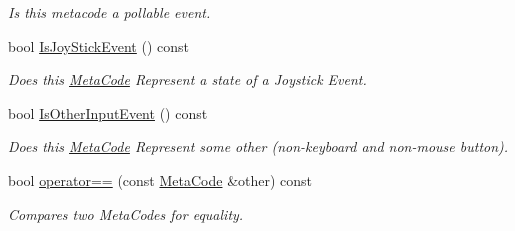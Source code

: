 \begin{DoxyCompactItemize}
\begin{DoxyCompactList}\small\item\em Is this metacode a pollable event. \item\end{DoxyCompactList}\item 
bool \hyperlink{classphys_1_1MetaCode_a00ad1171e9e081318e6efc25a371ee05}{IsJoyStickEvent} () const 
\begin{DoxyCompactList}\small\item\em Does this \hyperlink{classphys_1_1MetaCode}{MetaCode} Represent a state of a Joystick Event. \item\end{DoxyCompactList}\item 
bool \hyperlink{classphys_1_1MetaCode_a6eb682ae2a56238c6afd3933cb40843b}{IsOtherInputEvent} () const 
\begin{DoxyCompactList}\small\item\em Does this \hyperlink{classphys_1_1MetaCode}{MetaCode} Represent some other (non-\/keyboard and non-\/mouse button). \item\end{DoxyCompactList}\item 
bool \hyperlink{classphys_1_1MetaCode_a506486e5a6f08d50a5af42fa6d48a7f5}{operator==} (const \hyperlink{classphys_1_1MetaCode}{MetaCode} \&other) const 
\begin{DoxyCompactList}\small\item\em Compares two MetaCodes for equality. \item\end{DoxyCompactList}\end{DoxyCompactItemize}
